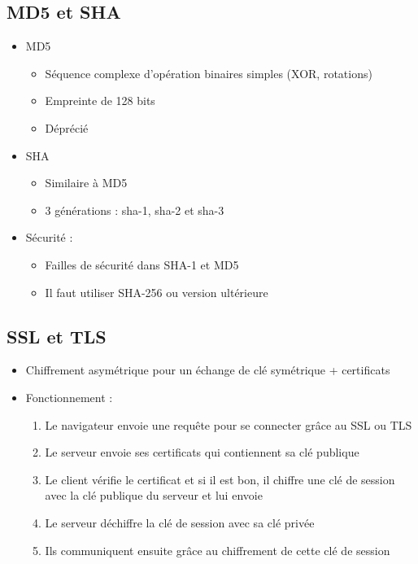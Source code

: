 \documentclass[a4paper]{article}
\begin{document}
\subsection{MD5 et SHA}
\begin{itemize}[label=\textbullet, font=\Large]
    \item MD5
    \begin{itemize}[label=, font=\scriptsize]
        \item Séquence complexe d'opération binaires simples (XOR, rotations)
        \item Empreinte de 128 bits
        \item Déprécié
    \end{itemize}
    \item SHA
    \begin{itemize}[label=, font=\scriptsize]
        \item Similaire à MD5
        \item 3 générations : sha-1, sha-2 et sha-3
    \end{itemize}
    \item Sécurité :
    \begin{itemize}[label=, font=\scriptsize]
        \item Failles de sécurité dans SHA-1 et MD5
        \item Il faut utiliser SHA-256 ou version ultérieure
    \end{itemize}
\end{itemize}

\subsection{SSL et TLS}
\begin{itemize}[label=\textbullet, font=\Large]
    \item Chiffrement asymétrique pour un échange de clé symétrique + certificats
    \item Fonctionnement :
    \begin{enumerate}
        \item Le navigateur envoie une requête pour se connecter grâce au SSL ou TLS
        \item Le serveur envoie ses certificats qui contiennent sa clé publique
        \item Le client vérifie le certificat et si il est bon, il chiffre une clé de session avec la clé publique du serveur et lui envoie
        \item Le serveur déchiffre la clé de session avec sa clé privée
        \item Ils communiquent ensuite grâce au chiffrement de cette clé de session
    \end{enumerate}
\end{itemize}
\end{document}
